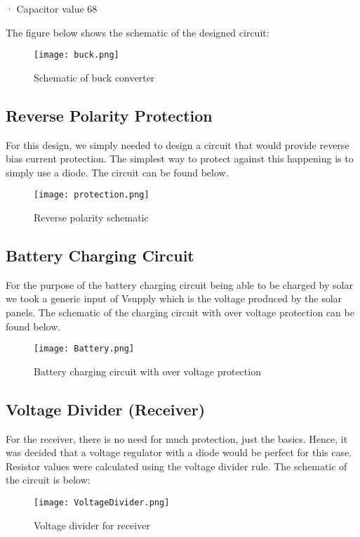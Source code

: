 \documentclass[class=report,11pt,crop=false]{standalone}
\begin{document}
· Capacitor value 68 

The figure below shows the schematic of the designed circuit:
\begin{figure}
    \centering
    \texttt{[image: buck.png]}
    \caption{Schematic of buck converter}
\end{figure}

\subsection{Reverse Polarity Protection}

For this design, we simply needed to design a circuit that would provide reverse bias current protection. The simplest way to protect against this happening is to simply use a diode. The circuit can be found below.
\begin{figure}
    \centering
    \texttt{[image: protection.png]}
    \caption{Reverse polarity schematic}
    \label{fig:enter-label3}
\end{figure}

\subsection{Battery Charging Circuit}

For the purpose of the battery charging circuit being able to be charged by solar we took a generic input of Vsupply which is the voltage produced by the solar panels. The schematic of the charging circuit with over voltage protection can be found below.
\begin{figure}
    \centering
    \texttt{[image: Battery.png]}
    \caption{Battery charging circuit with over voltage protection}
    \label{fig:enter-label4}
\end{figure}

\subsection{Voltage Divider (Receiver)}

For the receiver, there is no need for much protection, just the basics. Hence, it was decided that a voltage regulator with a diode would be perfect for this case. Resistor values were calculated using the voltage divider rule. The schematic of the circuit is below:
\begin{figure}
    \centering
    \texttt{[image: VoltageDivider.png]}
    \caption{Voltage divider for receiver}
    \label{fig:enter-label5}
\end{figure}
\end{document}
